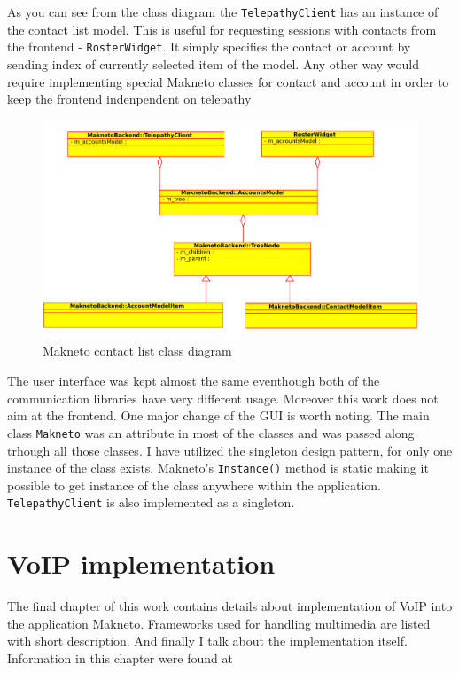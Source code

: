 As you can see from the class diagram the \verb|TelepathyClient| has an instance of the contact list model. This is useful for requesting sessions with contacts from the frontend - \verb|RosterWidget|. It simply specifies the contact or account by sending index of currently selected item of the model. Any other way would require implementing special Makneto classes for contact and account in order to keep the frontend indenpendent on telepathy   

\begin{figure}[ht]
	\begin{center}
	\includegraphics[width=15cm]{fig/contact-list-class-diag.pdf}
	\caption{Makneto contact list class diagram}
	\label{fig:contactListClassDiag}
\end{center}
\end{figure}

The user interface was kept almost the same eventhough both of the communication libraries have very different usage. Moreover this work does not aim at the frontend. One major change of the GUI is worth noting. The main class \verb|Makneto| was an attribute in most of the classes and was passed along trhough all those classes. I have utilized the singleton design pattern, for only one instance of the class exists. Makneto's \verb|Instance()| method is static making it possible to get instance of the class  anywhere within the application. \verb|TelepathyClient| is also implemented as a singleton. 


\chapter{VoIP implementation}\label{chapter:voip-implementation}
The final chapter of this work contains details about implementation of VoIP into the application Makneto. Frameworks used for handling multimedia are listed with short description. And finally I talk about the implementation itself. Information in this chapter were found at \cite{gstreamer, phonon, farsight} 

